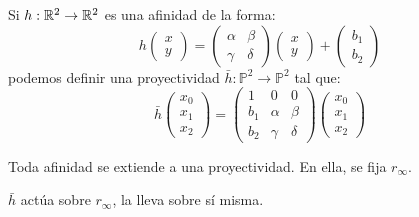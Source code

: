 Si $h: \mathbb{R}^2 \to \mathbb{R}^2$ es una afinidad de la forma:
\[
h \begin{pmatrix}
x\\
y
\end{pmatrix}  = \begin{pmatrix}
 \alpha & \beta \\
 \gamma & \delta
\end{pmatrix} \begin{pmatrix}
x\\
y
\end{pmatrix} + \begin{pmatrix}
b_1\\
b_2
\end{pmatrix}
\]
podemos definir una proyectividad $\bar h : \mathbb P ^2 \to \mathbb P^2$ tal que:
\[
\bar{h} \begin{pmatrix}
 x_0\\
 x_1\\
 x_2
\end{pmatrix}  = \begin{pmatrix}
 1 & 0 & 0 \\
 b_1 & \alpha & \beta \\
 b_2 & \gamma & \delta
\end{pmatrix} \begin{pmatrix}
 x_0\\
 x_1\\
 x_2
\end{pmatrix}
\]

\begin{nprop}
	Toda afinidad se extiende a una proyectividad. En ella, se fija $r_\infty$.
\end{nprop}

\begin{nprop}
	$\bar h$ actúa sobre $r_\infty$, la lleva sobre sí misma.
\end{nprop}

